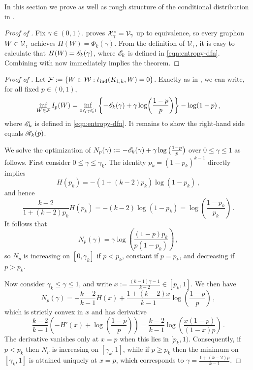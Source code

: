 In this section we prove  as well as rough structure of the conditional distribution in .

\begin{proof}[Proof of ]
Fix $\gamma\in(0,1)$.  proves ${\mathcal X}^\ast_\gamma={\mathcal V}_\gamma$ up to equivalence, so every graphon $W\in{\mathcal V}_\gamma$ achieves $H(W)=\Phi_k(\gamma)$. From the definition of ${\mathcal V}_\gamma$, it is easy to calculate that $H(W)={\mathscr E}_k(\gamma)$, where ${\mathscr E}_k$ is defined in \eqref{eqn:entropy-dfn}. Combining with  now immediately implies the theorem.
\end{proof}

\begin{proof}[Proof of ]
Let ${\mathcal F}:=\{W\in{\mathcal W}:t_{\hspace{0.2mm}\mathrm{ind}}(K_{1,k},W)=0\}$.
Exactly as in \cite[Eq.~17]{perkins2025typical}, we can write, for all fixed $p\in(0,1)$,
\begin{equation}\label{eqn:sup-gamma-calc}
\inf_{W\in{\mathcal F}}I_p(W)=\inf_{0\leqslant\gamma\leqslant1}\left\{-{\mathscr E}_k(\gamma)+\gamma\log\!\left(\frac{1-p}{p}\right)\right\}-\log(1-p)\,,
\end{equation}
where ${\mathscr E}_k$ is defined in \eqref{eqn:entropy-dfn}. It remains to show the right-hand side equals ${\mathscr R}_k(p)$.

We solve the optimization of $N_p(\gamma):=-{\mathscr E}_k(\gamma)+\gamma\log\big(\frac{1-p}{p}\big)$ over $0\leq\gamma\leq1$ as follows. First consider $0\leq\gamma\leq\gamma_k$. The identity $p_k=(1-p_k)^{k-1}$ directly implies
$$H(p_k)=-(1+(k-2)p_k)\log(1-p_k)\,,$$
and hence
$$\frac{k-2}{1+(k-2)p_k}H(p_k)=-(k-2)\log(1-p_k)=\log\!\left(\frac{1-p_k}{p_k}\right)\,.$$
It follows that
$$N_p(\gamma)=\gamma\log\!\left(\frac{(1-p)p_k}{p(1-p_k)}\right)\,,$$
so $N_p$ is increasing on $[0,\gamma_k]$ if $p<p_k$, constant if $p=p_k$, and decreasing if $p>p_k$.

Now consider $\gamma_k\leq\gamma\leq1$, and write $x:=\frac{(k-1)\gamma-1}{k-2}\in[p_k,1]$.
We then have
$$N_p(\gamma)=-\frac{k-2}{k-1}H(x)+\frac{1+(k-2)x}{k-1}\log\!\left(\frac{1-p}{p}\right)\,,$$
which is strictly convex in $x$ and has derivative
$$\frac{k-2}{k-1}\left(-H'(x)+\log\!\left(\frac{1-p}{p}\right)\right)=\frac{k-2}{k-1}\log\!\left(\frac{x(1-p)}{(1-x)p}\right)\,.$$
The derivative vanishes only at $x=p$ when this lies in $[p_k,1)$. Consequently, if $p<p_k$ then $N_p$ is increasing on $[\gamma_k,1]$, while if $p\geq p_k$ then the minimum on $[\gamma_k,1]$ is attained uniquely at $x=p$, which corresponds to $\gamma=\frac{1+(k-2)p}{k-1}$.


\end{proof}
